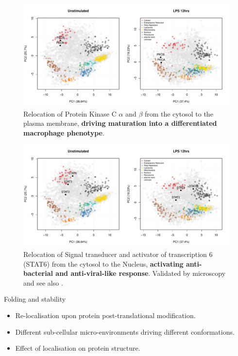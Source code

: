 \begin{frame}
  \begin{figure}[h]
    \centering
    \includegraphics[width=\linewidth]{./figs/lps-pkc.pdf}
    \caption{Relocation of Protein Kinase C $\alpha$ and $\beta$ from the
      cytosol to the plasma membrane, \textbf{driving maturation into
        a differentiated macrophage phenotype}.}
  \end{figure}
\end{frame}

\begin{frame}
  \begin{figure}[h]
    \centering
    \includegraphics[width=\linewidth]{./figs/lps-stat.pdf}
    \caption{Relocation of Signal transducer and activator of
      transcription 6 (STAT6) from the cytosol to the Nucleus,
      \textbf{activating anti-bacterial and anti-viral-like
        response}. Validated by microscopy and see also
      \cite{Chen:2011}.}
  \end{figure}
\end{frame}



\begin{frame}
  \begin{block}{Folding and stability}
      \begin{itemize}
      \item Re-localisation upon protein post-translational modification.
      \item Different sub-cellular micro-environments driving
        different conformations.
      \item Effect of localisation on protein structure.
      \end{itemize}
  \end{block}
\end{frame}
